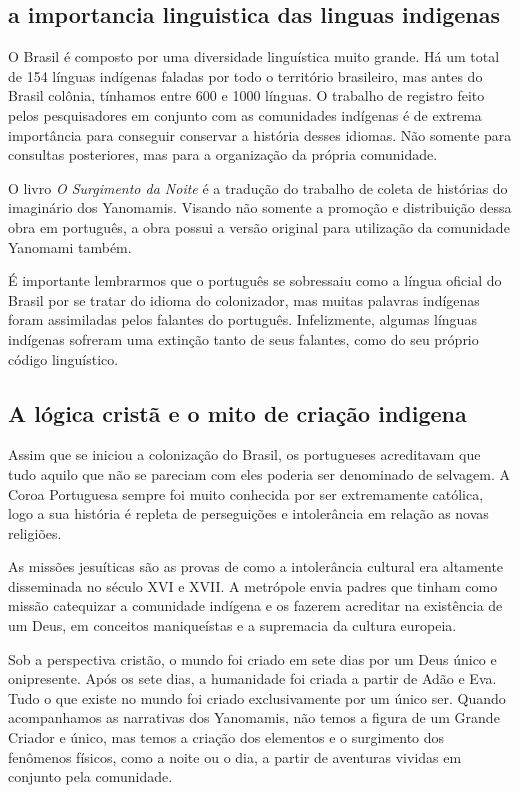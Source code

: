 \documentclass[12pt]{extarticle}
\begin{document}
\subsection{a importancia linguistica das linguas indigenas }

O Brasil é composto por uma diversidade linguística muito grande. Há um
total de 154 línguas indígenas faladas por todo o território brasileiro,
mas antes do Brasil colônia, tínhamos entre 600 e 1000 línguas. O
trabalho de registro feito pelos pesquisadores em conjunto com as
comunidades indígenas é de extrema importância para conseguir conservar
a história desses idiomas. Não somente para consultas posteriores, mas
para a organização da própria comunidade.

O livro \emph{O Surgimento da Noite} é a tradução do trabalho de coleta
de histórias do imaginário dos Yanomamis. Visando não somente a promoção
e distribuição dessa obra em português, a obra possui a versão original
para utilização da comunidade Yanomami também.


É importante lembrarmos que o português se sobressaiu como a língua
oficial do Brasil por se tratar do idioma do colonizador, mas muitas
palavras indígenas foram assimiladas pelos falantes do português.
Infelizmente, algumas línguas indígenas sofreram uma extinção tanto de
seus falantes, como do seu próprio código linguístico.

\subsection{A lógica cristã e o mito de criação indigena}

Assim que se iniciou a colonização do Brasil, os portugueses acreditavam
que tudo aquilo que não se pareciam com eles poderia ser denominado de
selvagem. A Coroa Portuguesa sempre foi muito conhecida por ser
extremamente católica, logo a sua história é repleta de perseguições e
intolerância em relação as novas religiões.

As missões jesuíticas são as provas de como a intolerância cultural era
altamente disseminada no século XVI e XVII. A metrópole envia padres que
tinham como missão catequizar a comunidade indígena e os fazerem
acreditar na existência de um Deus, em conceitos maniqueístas e a
supremacia da cultura europeia.

Sob a perspectiva cristão, o mundo foi criado em sete dias por um Deus
único e onipresente. Após os sete dias, a humanidade foi criada a partir
de Adão e Eva. Tudo o que existe no mundo foi criado exclusivamente por
um único ser. Quando acompanhamos as narrativas dos Yanomamis, não temos
a figura de um Grande Criador e único, mas temos a criação dos elementos
e o surgimento dos fenômenos físicos, como a noite ou o dia, a partir de
aventuras vividas em conjunto pela comunidade.
\end{document}
